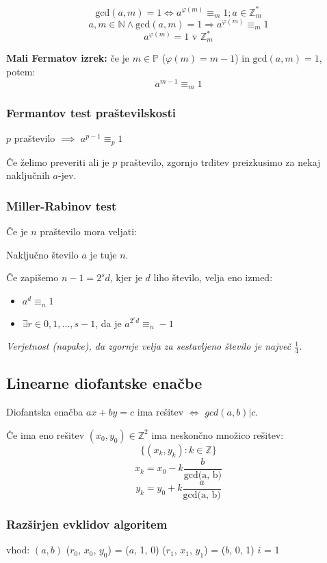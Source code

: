 \begin{multicols}{5}
\[\textrm{gcd}(a, m) = 1 \Leftrightarrow a^{\varphi(m)} \equiv_m 1; a \in \mathbb{Z}_m^*\]
\[a,m \in \mathbb{N} \wedge \textrm{gcd}(a, m) = 1 \Rightarrow a^{\varphi(m)} \equiv_m 1\]
\[a^{\varphi(m)} = 1 \text{ v } \mathbb{Z}_m^*\]

\textbf{Mali Fermatov izrek:} če je $m \in \mathbb{P}$ ($\varphi(m) = m-1$) in $\textrm{gcd}(a,m) = 1$, potem:
\[a^{m-1} \equiv_m 1\]

\subsubsection{Fermantov test praštevilskosti}
$p$ praštevilo $\implies$ $a^{p-1} \equiv_p 1$

Če želimo preveriti ali je $p$ praštevilo, zgornjo trditev preizkusimo za nekaj naključnih $a$-jev.

\subsubsection*{Miller-Rabinov test}
Če je $n$ praštevilo mora veljati:

Naključno število $a$ je tuje $n$.

Če zapišemo $n - 1 = 2^s d$, kjer je $d$ liho število, velja eno izmed:
\begin{itemize}
	\item $a^d \equiv_n 1$
	\item $\exists r \in {0,1,\dots, s-1}$, da je $a^{2^r d} \equiv_n -1$
\end{itemize}

\textit{Verjetnost (napake), da zgornje velja za sestavljeno število je največ $\frac{1}{4}$.}

\subsection{Linearne diofantske enačbe}
Diofantska enačba $ax + by = c$ ima rešitev $\Leftrightarrow$ $gcd(a, b) | c$. 

Če ima eno rešitev $(x_0, y_0) \in \mathbb{Z}^2$ ima neskončno množico rešitev:
\[\{(x_k, y_k) : k \in \mathbb{Z}\}\]
\[x_k = x_0 - k\frac{b}{\textrm{gcd(a, b)}}\]
\[y_k = y_0 + k\frac{a}{\textrm{gcd(a, b)}}\]

\subsubsection*{Razširjen evklidov algoritem}

\begin{koda}
vhod: $(a, b)$
($r_0$, $x_0$, $y_0$) = ($a$, 1, 0)
($r_1$, $x_1$, $y_1$) = ($b$, 0, 1)
$i$ = 1


\end{koda}
\end{multicols}
